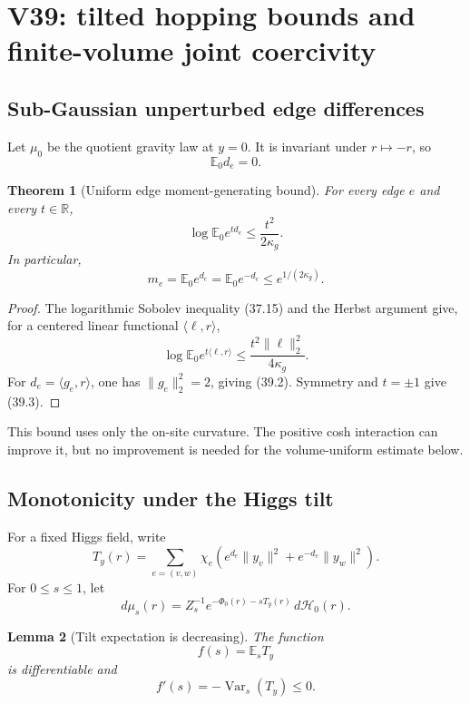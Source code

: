 \documentclass[11pt]{article}
\newtheorem{theorem}{Theorem}[section]
\newtheorem{lemma}[theorem]{Lemma}
\theoremstyle{remark}
\begin{document}
\section{V39: tilted hopping bounds and finite-volume joint coercivity}
\label{sec:v17v39}

\subsection{Sub-Gaussian unperturbed edge differences}

Let \(\mu_0\) be the quotient gravity law at \(y=0\).  It is invariant
under \(r\mapsto-r\), so
\[
 \mathbb E_0d_e=0.                                 \tag{39.1}
\]

\begin{theorem}[Uniform edge moment-generating bound]
\label{thm:v17v39-mgf}
For every edge \(e\) and every \(t\in\mathbb R\),
\[
 \boxed{
 \log\mathbb E_0e^{t d_e}
 \leq\frac{t^2}{2\kappa_g}.}                      \tag{39.2}
\]
In particular,
\[
 m_e=\mathbb E_0e^{d_e}=\mathbb E_0e^{-d_e}
 \leq e^{1/(2\kappa_g)}.                          \tag{39.3}
\]
\end{theorem}

\begin{proof}
The logarithmic Sobolev inequality (37.15) and the Herbst argument give,
for a centered linear functional \(\langle\ell,r\rangle\),
\[
 \log\mathbb E_0e^{t\langle\ell,r\rangle}
 \leq\frac{t^2\|\ell\|_2^2}{4\kappa_g}.          \tag{39.4}
\]
For \(d_e=\langle g_e,r\rangle\), one has
\(\|g_e\|_2^2=2\), giving (39.2).  Symmetry and \(t=\pm1\) give
(39.3).
\end{proof}

This bound uses only the on-site curvature.  The positive cosh
interaction can improve it, but no improvement is needed for the
volume-uniform estimate below.

\subsection{Monotonicity under the Higgs tilt}

For a fixed Higgs field, write
\[
 T_y(r)=\sum_{e=(v,w)}\chi_e\left(
 e^{d_e}\|y_v\|^2+e^{-d_e}\|y_w\|^2
 \right).                                         \tag{39.5}
\]
For \(0\leq s\leq1\), let
\[
 d\mu_s(r)=Z_s^{-1}e^{-\Phi_0(r)-sT_y(r)}
 \,d\mathcal H_0(r).                              \tag{39.6}
\]

\begin{lemma}[Tilt expectation is decreasing]
\label{lem:v17v39-tilt}
The function
\[
 f(s)=\mathbb E_sT_y                               \tag{39.7}
\]
is differentiable and
\[
 f'(s)=-\operatorname{Var}_s(T_y)\leq0.            \tag{39.8}
\]
\end{lemma}
\end{document}
